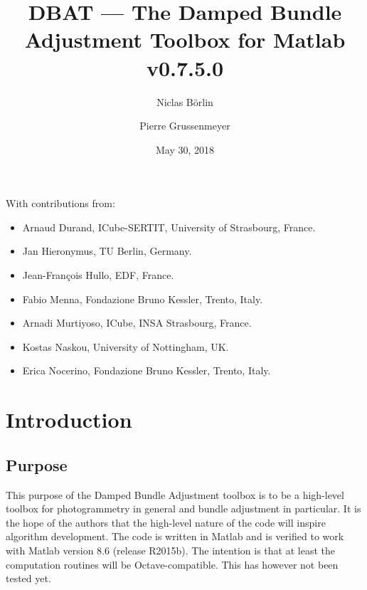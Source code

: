 \documentclass{article}
\begin{document}


\newcommand{\dbatversion}{0.7.5.0}
\newcommand{\dbatdate}{May 30, 2018}

\title{DBAT --- The Damped Bundle Adjustment Toolbox for Matlab\\\Large v\dbatversion{}}

\author[1]{Niclas B{\"o}rlin}
\author[2]{Pierre Grussenmeyer}
\date{\dbatdate}

\maketitle

\vfill
With contributions from:
\begin{itemize}
\item Arnaud Durand, ICube-SERTIT, University of Strasbourg, France.
\item Jan Hieronymus, TU Berlin, Germany.
\item Jean-Fran{\c{c}}ois Hullo, EDF, France.
\item Fabio Menna, Fondazione Bruno Kessler, Trento, Italy.
\item Arnadi Murtiyoso, ICube, INSA Strasbourg, France.
\item Kostas Naskou, University of Nottingham, UK.
\item Erica Nocerino, Fondazione Bruno Kessler, Trento, Italy.
\end{itemize}
\newpage

\tableofcontents

\newpage

\section{Introduction}

\subsection{Purpose}

This purpose of the Damped Bundle Adjustment toolbox is to be a
high-level toolbox for photogrammetry in general and bundle adjustment
in particular. It is the hope of the authors that the high-level
nature of the code will inspire algorithm development. The code is
written in Matlab and is verified to work with Matlab version 8.6
(release R2015b). The intention is that at least the computation
routines will be Octave-compatible. This has however not been tested
yet.
\end{document}
